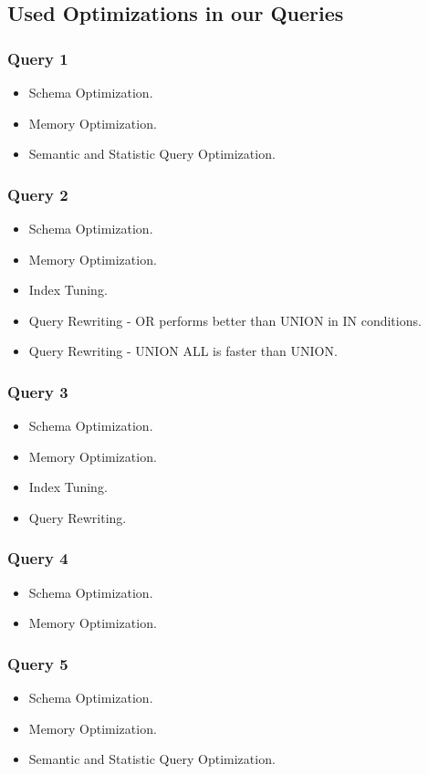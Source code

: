 \subsection{Used Optimizations in our Queries}
\subsubsection{Query 1}
\begin{itemize}
    \item  Schema Optimization.
    \item  Memory Optimization.
    \item  Semantic and Statistic Query Optimization.
\end{itemize}

\subsubsection{Query 2}
\begin{itemize}
    \item  Schema Optimization.
    \item  Memory Optimization.
    \item  Index Tuning.
    \item  Query Rewriting -  OR performs better than UNION in IN conditions.
    \item  Query Rewriting - UNION ALL is faster than UNION.
\end{itemize}

\subsubsection{Query 3}
\begin{itemize}
    \item  Schema Optimization.
    \item  Memory Optimization.
    \item  Index Tuning.
    \item  Query Rewriting.
\end{itemize}

\subsubsection{Query 4}
\begin{itemize}
    \item  Schema Optimization.
    \item  Memory Optimization.
\end{itemize}

\subsubsection{Query 5}
\begin{itemize}
    \item  Schema Optimization.
    \item  Memory Optimization.
    \item  Semantic and Statistic Query Optimization.
\end{itemize}
